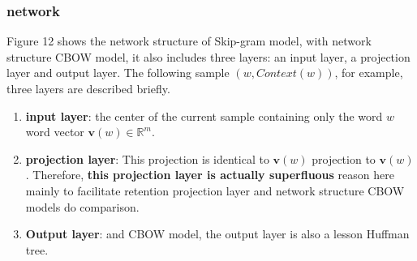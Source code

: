 \documentclass[12pt,a4paper,twoside]{book}
\begin{document}
\subsubsection{network}
Figure 12 shows the network structure of Skip-gram model, with network structure CBOW model, it also includes three layers: an input layer, a projection layer and output layer. The following sample $(w,Context(w))$, for example, three layers are described briefly.
\begin{enumerate}
\item \textbf{input layer}: the center of the current sample containing only the word $w$ word vector $\mathbf{v}(w)\in\mathbb{R}^m$.
\item \textbf{projection layer}: This projection is identical to $\mathbf{v}(w)$ projection to $\mathbf{v}(w)$. Therefore, \textbf{this projection layer is actually superfluous} reason here mainly to facilitate retention projection layer and network structure CBOW models do comparison.
\item \textbf{Output layer}: and CBOW model, the output layer is also a lesson Huffman tree.
\end{enumerate}
\end{document}
